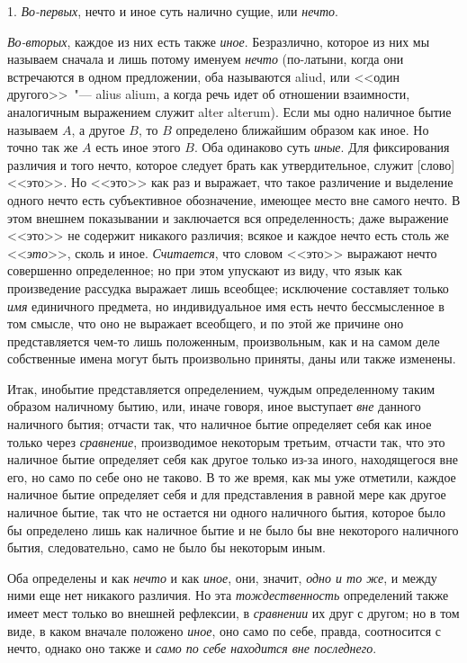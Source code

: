 1. \emph{Во-первых}, нечто и иное суть налично сущие, или
\emph{нечто}.

\emph{Во-вторых}, каждое из них есть также \emph{иное}. Безразлично,
которое из них мы называем сначала и лишь потому
именуем \emph{нечто} (по-латыни, когда они встречаются
в одном предложении, оба называются aliud, или <<один
другого>>~"--- alius alium, а когда речь идет об отношении
взаимности, аналогичным выражением служит alter alterum).
Если мы одно наличное бытие называем $A$, а другое
$B$, то $B$ определено ближайшим образом как иное.
Но точно так же $A$ есть иное этого $B$. Оба одинаково суть
\emph{иные}. Для фиксирования различия и того нечто, которое
следует брать как утвердительное, служит [слово] <<это>>\endnotemark{}.
Но <<это>> как раз и выражает, что такое различение и выделение
одного нечто есть субъективное обозначение,
имеющее место вне самого нечто. В этом внешнем показывании
и заключается вся определенность; даже выражение
<<это>> не содержит никакого различия; всякое и каждое
нечто есть столь же <<\emph{это}>>, сколь и иное. \emph{Считается}, что
словом <<это>> выражают нечто совершенно определенное;
но при этом упускают из виду, что язык как произведение
рассудка выражает лишь всеобщее; исключение составляет
только \emph{имя} единичного предмета, но индивидуальное
имя есть нечто бессмысленное в том смысле, что оно
не выражает всеобщего, и по этой же причине оно представляется
чем-то лишь положенным, произвольным, как
и на самом деле собственные имена могут быть произвольно
приняты, даны или также изменены.


Итак, инобытие представляется определением, чуждым
определенному таким образом наличному бытию,
или, иначе говоря, иное выступает \emph{вне} данного наличного
бытия; отчасти так, что наличное бытие определяет
себя как иное только через \emph{сравнение}, производимое некоторым
третьим, отчасти так, что это наличное бытие
определяет себя как другое только из-за иного, находящегося
вне его, но само по себе оно не таково. В то же
время, как мы уже отметили, каждое наличное бытие
определяет себя и для представления в равной мере как
другое наличное бытие, так что не остается ни одного
наличного бытия, которое было бы определено лишь как
наличное бытие и не было бы вне некоторого наличного
бытия, следовательно, само не было бы некоторым иным.

Оба определены и как \emph{нечто} и как \emph{иное}, они, значит,
\emph{одно и то же}, и между ними еще нет никакого различия.
Но эта \emph{тождественность} определений также имеет мест
только во внешней рефлексии, в \emph{сравнении} их друг с другом;
но в том виде, в каком вначале положено \emph{иное}, оно
само по себе, правда, соотносится с нечто, однако оно
также и \emph{само по себе находится вне последнего}.

